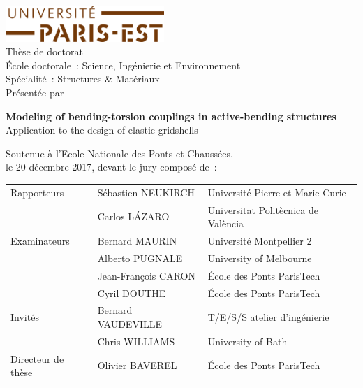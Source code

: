 \begin{titlepage}
\begin{center}

\includegraphics[width=6cm]{head/logo_upe}\\
\vspace{2cm}
{\Large Thèse de doctorat} \\
{\large École doctorale~: Science, Ingénierie et Environnement}\\
{\large Spécialité~: Structures \& Matériaux}\\
\vspace{18pt}
{\Large Présentée par}\\
{\large \myauthor}

\vfill

{\ttfamily
{\bfseries\huge  Modeling of bending-torsion couplings in active-bending structures}
\\\vspace{12pt}
{\Large Application to the design of elastic gridshells}
}

\vfill
\setlength{\parskip}{0em}
{\large Soutenue à l'Ecole Nationale des Ponts et Chaussées,\\\vspace{-10.0pt}le 20 décembre 2017, devant le jury composé de~:}

\vspace{1.5cm}

{\setlength{\tabcolsep}{0.5cm}
\begin{tabular}{@{}>{}lll@{}}

Rapporteurs 		& Sébastien NEUKIRCH 		& Université Pierre et Marie Curie\\
 				& Carlos LÁZARO 			& Universitat Politècnica de València\\
\addlinespace
Examinateurs		& Bernard MAURIN 			& Université Montpellier 2\\
 				& Alberto PUGNALE 		& University of Melbourne\\
 				& Jean-François CARON 		& École des Ponts ParisTech\\
 				& Cyril DOUTHE 			& École des Ponts ParisTech\\
\addlinespace
Invités 			& Bernard VAUDEVILLE 		& T/E/S/S atelier d'ingénierie\\
 				& Chris WILLIAMS 			& University of Bath\\
\addlinespace
Directeur de thèse 	& Olivier BAVEREL 			& École des Ponts ParisTech\\
\end{tabular}}

\end{center}
\end{titlepage}
